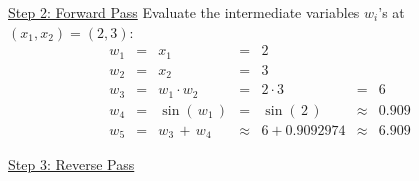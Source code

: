 \vskip 0.5cm
\noindent
\underline{Step 2: Forward Pass}
\vskip 0.2cm
\noindent
Evaluate the intermediate variables $w_{i}$'s at $(x_{1},x_{2}) = (2,3)$:
\begin{equation*}
\begin{array}{ccccccl}
w_{1} & = & x_{1} &=& 2
\\
w_{2} & = & x_{2} &=& 3
\\
w_{3} & = & w_{1} \cdot w_{2} &=& 2 \cdot 3 & = & 6
\\
w_{4} & = & \sin(\,w_{1}\,) & = & \sin(\,2\,) & \approx & 0.909
\\
w_{5} & = & w_{3} \, + \, w_{4} & \approx & 6 + 0.9092974 & \approx & 6.909
\end{array}
\end{equation*}

\clearpage
\noindent
\underline{Step 3: Reverse Pass}
\vskip 0.2cm
